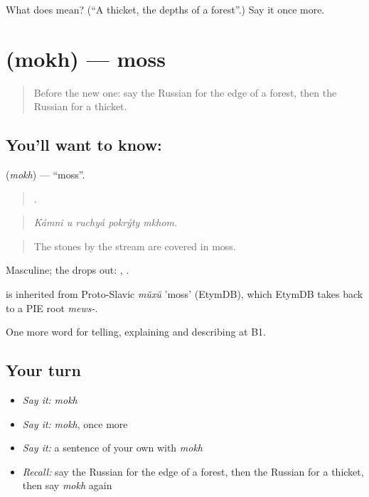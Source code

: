 \begin{tcolorbox}[breakable,colback=teal!4,colframe=teal!35!black,title={Before you move on}]
What does  mean? (\textquotedblleft{}A thicket, the depths of a forest\textquotedblright{}.) Say it once more.
\end{tcolorbox}
\section[\texorpdfstring{\ru{мох} (mokh)}{мох (mokh)}]{ (mokh) — moss}

\label{lesson:RU-C461-mokh}



\begin{quote}
Before the new one: say the Russian for the edge of a forest, then the Russian for a thicket.
\end{quote}

\subsection*{You'll want to know: }
\textbf{} (\emph{mokh}) — \textquotedblleft{}moss\textquotedblright{}.

\begin{quote}
    .
\end{quote}

\begin{quote}
\emph{Kámni u ruchyá pokrýty mkhom.}
\end{quote}

\begin{quote}
The stones by the stream are covered in moss.
\end{quote}

Masculine; the  drops out: \emph{}, \emph{ }.

\begin{cousinweb}
\emph{} is inherited from Proto-Slavic \emph{mŭxŭ} 'moss' (EtymDB), which EtymDB takes back to a PIE root \emph{mews-}.
\end{cousinweb}

\begin{grammarlens}[title={What you've built}]
One more word for telling, explaining and describing at B1.
\end{grammarlens}

\subsection*{Your turn}
\begin{itemize}
\raggedright
  \item \emph{Say it:} \emph{mokh}
  \item \emph{Say it:} \emph{mokh}, once more
  \item \emph{Say it:} a sentence of your own with \emph{mokh}
  \item \emph{Recall:} say the Russian for the edge of a forest, then the Russian for a thicket, then say \emph{mokh} again
\end{itemize}

